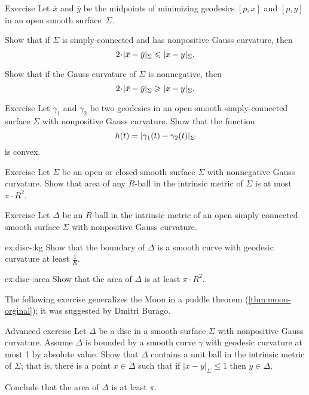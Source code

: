 \begin{thm}{Exercise}\label{ex:midpoints}
Let $\bar x$ and $\bar y$ be the midpoints of minimizing geodesics $[p,x]$ and $[p,y]$ in an open smooth surface~$\Sigma$.

\begin{subthm}{}
Show that if $\Sigma$ is simply-connected and has nonpositive Gauss curvature, then 
\[2\cdot \dist{\bar x}{\bar y}\Sigma\le \dist{x}{y}\Sigma.\]
\end{subthm}
 
\begin{subthm}{} Show that if the Gauss curvature of $\Sigma$ is nonnegative, then 
 \[2\cdot \dist{\bar x}{\bar y}\Sigma\ge \dist{x}{y}\Sigma.\]
\end{subthm}

\end{thm}

\begin{thm}{Exercise}\label{ex:convex-dist}
Let $\gamma_1$ and $\gamma_2$ be two geodesics in an open smooth simply-connected surface $\Sigma$ with nonpositive Gauss curvature.
Show that the function
\[h(t)=\dist{\gamma_1(t)}{\gamma_2(t)}\Sigma\]
is convex.
\end{thm}

\begin{thm}{Exercise}\label{ex:disc+}
Let $\Sigma$ be an open or closed smooth surface $\Sigma$ with nonnegative Gauss curvature.
Show that area of any $R$-ball in the intrinsic metric of $\Sigma$ is at most $\pi\cdot R^2$.

\end{thm}

\begin{thm}{Exercise}\label{ex:disc-}
Let $\Delta$ be an $R$-ball in the intrinsic metric of an open simply connected smooth surface $\Sigma$  with nonpositive Gauss curvature.

\begin{subthm}{ex:disc-:kg}
Show that the boundary of $\Delta$ is a smooth curve with geodesic curvature at least $\tfrac1R$.
\end{subthm}

\begin{subthm}{ex:disc-:area}
Show that the area of $\Delta$ is at least $\pi\cdot R^2$.
\end{subthm}

\end{thm}

The following exercise generalizes the Moon in a puddle theorem (\ref{thm:moon-orginal});
it was suggested by Dmitri Burago.

\begin{thm}{Advanced exercise}\label{ex:moon-}
Let $\Delta$ be a disc in a smooth surface $\Sigma$ with nonpositive Gauss curvature.
Assume $\Delta$ is bounded by a smooth curve $\gamma$ with geodesic curvature at most 1 by absolute value.
Show that $\Delta$ contains a unit ball in the intrinsic metric of $\Sigma$;
that is, there is a point $x\in \Delta$ such that if $|x-y|_\Sigma\le 1$ then $y\in\Delta$.

Conclude that the area of $\Delta$ is at least $\pi$.
\end{thm}

